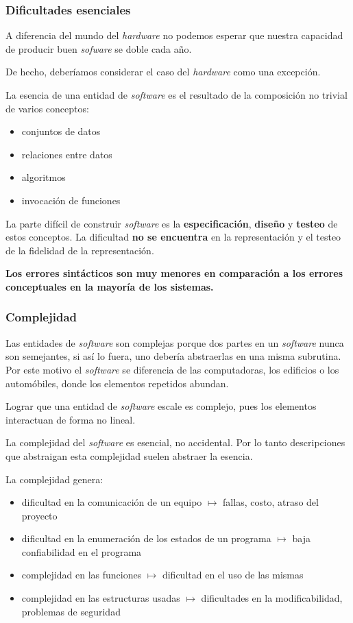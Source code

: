 \documentclass{beamer}
\begin{document}
\begin{frame}[fragile]
  \frametitle{Dificultades esenciales}

  A diferencia del mundo del \textit{hardware} no podemos esperar que nuestra
  capacidad de producir buen \textit{sofware} se doble cada a\~no.

  De hecho, deber\'iamos considerar el caso del \textit{hardware} como una
  excepci\'on.

  La esencia de una entidad de \textit{software} es el resultado de la
  composici\'on no trivial de varios conceptos:
  \begin{itemize}
    \item conjuntos de datos
    \item relaciones entre datos
    \item algoritmos
    \item invocaci\'on de funciones
  \end{itemize}

  La parte dif\'icil de construir \textit{software} es la
  \textbf{especificaci\'on}, \textbf{dise\~no} y \textbf{testeo} de estos
  conceptos.
  La dificultad \textbf{no se encuentra} en la representaci\'on y el testeo
  de la fidelidad de la representaci\'on.

  \textbf{Los errores sint\'acticos son muy menores en comparaci\'on a los
  errores conceptuales en la mayor\'ia de los sistemas.}
\end{frame}


\begin{frame}[fragile]
  \frametitle{Complejidad}

  Las entidades de \textit{software} son complejas porque dos partes en un
  \textit{software} nunca son semejantes, si as\'i lo fuera, uno deber\'ia
  abstraerlas en una misma subrutina. Por este motivo el \textit{software}
  se diferencia de las computadoras, los edificios o los autom\'obiles, donde
  los elementos repetidos abundan.

  Lograr que una entidad de \textit{software} escale es complejo, pues los
  elementos interactuan de forma no lineal.

  La complejidad del \textit{software} es esencial, no accidental. Por lo tanto
  descripciones que abstraigan esta complejidad suelen abstraer la esencia.

  La complejidad genera:
  \begin{itemize}
    \item dificultad en la comunicaci\'on de un equipo
      $\mapsto$ fallas, costo, atraso del proyecto
    \item dificultad en la enumeraci\'on de los estados de un programa
      $\mapsto$ baja confiabilidad en el programa
    \item complejidad en las funciones 
      $\mapsto$ dificultad en el uso de las mismas
    \item complejidad en las estructuras usadas
      $\mapsto$ dificultades en la modificabilidad, problemas de seguridad
  \end{itemize}

\end{frame}
\end{document}
